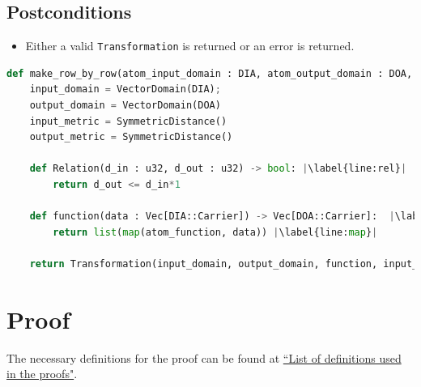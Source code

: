 \documentclass[11pt,a4paper]{article}
\begin{document}
\subsection*{Postconditions}
\begin{itemize}
    \item Either a valid \texttt{Transformation} is returned or an error is returned.
\end{itemize}


\begin{lstlisting}[language=Python, escapechar=|]
def make_row_by_row(atom_input_domain : DIA, atom_output_domain : DOA, atom_function : F):
    input_domain = VectorDomain(DIA);
    output_domain = VectorDomain(DOA)
    input_metric = SymmetricDistance()
    output_metric = SymmetricDistance()

    def Relation(d_in : u32, d_out : u32) -> bool: |\label{line:rel}|
        return d_out <= d_in*1
    
    def function(data : Vec[DIA::Carrier]) -> Vec[DOA::Carrier]:  |\label{line:fn}|
        return list(map(atom_function, data)) |\label{line:map}|
    
    return Transformation(input_domain, output_domain, function, input_metric, output_metric, stability_relation=Relation)

\end{lstlisting}


\section{Proof}
The necessary definitions for the proof can be found at \href{https://www.overleaf.com/project/60d214e390b337703d200982}{``List of definitions used in the proofs"}.
\end{document}
